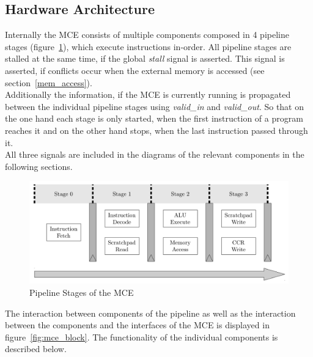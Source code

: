 \subsection{Hardware Architecture}

Internally the MCE consists of multiple components composed in 4 pipeline stages (figure~\ref{fig:mce_pipeline}), which execute instructions in-order.
All pipeline stages are stalled at the same time, if the global \emph{stall} signal is asserted. 
This signal is asserted, if conflicts occur when the external memory is accessed (see section~\ref{mem_access}).\\
Additionally the information, if the MCE is currently running is propagated between the individual pipeline stages using \emph{valid\_in} and \emph{valid\_out}.
So that on the one hand each stage is only started, when the first instruction of a program reaches it and on the other hand stops, when the last instruction passed through it.\\
All three signals are included in the diagrams of the relevant components in the following sections.

\begin{figure}[htb]
 \centering
 \includegraphics[width=1.0\textwidth,angle=0]{images/mce_pipeline}
 \caption{Pipeline Stages of the MCE}
\label{fig:mce_pipeline}
\end{figure}

The interaction between components of the pipeline as well as the interaction between the components and the interfaces of the MCE is displayed in figure~\ref{fig:mce_block}.
The functionality of the individual components is described below.



